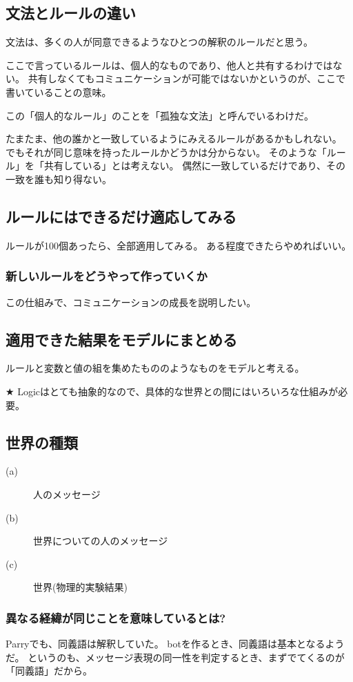 \documentclass[10pt, oneside]{jarticle}   	%
\begin{document}
\subsection{文法とルールの違い}
文法は、多くの人が同意できるようなひとつの解釈のルールだと思う。

ここで言っているルールは、個人的なものであり、他人と共有するわけではない。
共有しなくてもコミュニケーションが可能ではないかというのが、ここで書いていることの意味。

この「個人的なルール」のことを「孤独な文法」と呼んでいるわけだ。

たまたま、他の誰かと一致しているようにみえるルールがあるかもしれない。
でもそれが同じ意味を持ったルールかどうかは分からない。
そのような「ルール」を「共有している」とは考えない。
偶然に一致しているだけであり、その一致を誰も知り得ない。

\subsection{ルールにはできるだけ適応してみる}
ルールが100個あったら、全部適用してみる。
ある程度できたらやめればいい。

\subsubsection{新しいルールをどうやって作っていくか}
この仕組みで、コミュニケーションの成長を説明したい。

\subsection{適用できた結果をモデルにまとめる}
ルールと変数と値の組を集めたもののようなものをモデルと考える。

★ Logicはとても抽象的なので、具体的な世界との間にはいろいろな仕組みが必要。

\subsection{世界の種類}
\begin{description}
\item[ (a)] 人のメッセージ
\item[ (b)] 世界についての人のメッセージ
\item[ (c)] 世界(物理的実験結果)
\end{description}


\subsubsection{異なる経緯が同じことを意味しているとは?}
Parryでも、同義語は解釈していた。
botを作るとき、同義語は基本となるようだ。
というのも、メッセージ表現の同一性を判定するとき、まずでてくるのが「同義語」だから。
\end{document}
